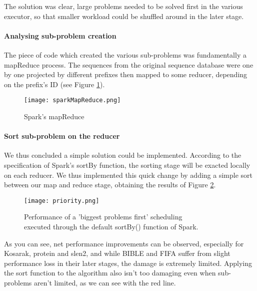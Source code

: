 \documentclass{eplmastersthesis}
\begin{document}
The solution was clear, large problems needed to be solved first in the various executor, so that smaller workload could be shuffled around in the later stage. 

\paragraph{Analysing sub-problem creation}

The piece of code which created the various sub-problems was fundamentally a mapReduce process. The sequences from the original sequence database were one by one projected by different prefixes then mapped to some reducer, depending on the prefix's ID (see Figure \ref{fig:sparkMapReduce}). \newline

\begin{figure}[h]
  \centering
  \texttt{[image: sparkMapReduce.png]}
  \caption{Spark's mapReduce}
  \label{fig:sparkMapReduce}
\end{figure}

\paragraph{Sort sub-problem on the reducer}

We thus concluded a simple solution could be implemented. According to the specification of Spark's sortBy function, the sorting stage will be exacted locally on each reducer. We thus implemented this quick change by adding a simple sort between our map and reduce stage, obtaining the results of Figure \ref{fig:priority_scheduling_performance_comparison}. \newline

\begin{figure}[h]
  \centering
  \texttt{[image: priority.png]}
  \caption[Naive priority scheduling]{
  		Performance of a 'biggest problems first' scheduling \\
  		executed through the default sortBy() function of Spark.
  	\endtabular
  }
  \label{fig:priority_scheduling_performance_comparison}
\end{figure}

As you can see, net performance improvements can be observed, especially for Kosarak, protein and slen2, and while BIBLE and FIFA suffer from slight performance loss in their later stages, the damage is extremely limited. Applying the sort function to the algorithm also isn't too damaging  even when sub-problems aren't limited, as we can see with the red line.\newline
\end{document}
